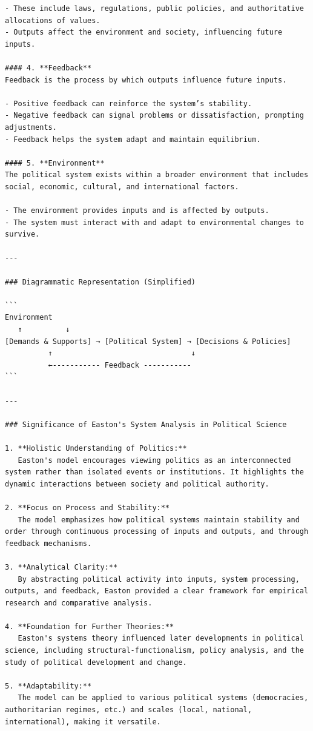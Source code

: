 \begin{instructbox}
\begin{lstlisting}[breakindent=0pt, breaklines=true, breakatwhitespace=true, frame=single, backgroundcolor=\color{green!10}]
- These include laws, regulations, public policies, and authoritative allocations of values.
- Outputs affect the environment and society, influencing future inputs.

#### 4. **Feedback**
Feedback is the process by which outputs influence future inputs.

- Positive feedback can reinforce the system’s stability.
- Negative feedback can signal problems or dissatisfaction, prompting adjustments.
- Feedback helps the system adapt and maintain equilibrium.

#### 5. **Environment**
The political system exists within a broader environment that includes social, economic, cultural, and international factors.

- The environment provides inputs and is affected by outputs.
- The system must interact with and adapt to environmental changes to survive.

---

### Diagrammatic Representation (Simplified)

```
Environment
   ↑          ↓
[Demands & Supports] → [Political System] → [Decisions & Policies]
          ↑                                ↓
          ←----------- Feedback -----------
```

---

### Significance of Easton's System Analysis in Political Science

1. **Holistic Understanding of Politics:**
   Easton's model encourages viewing politics as an interconnected system rather than isolated events or institutions. It highlights the dynamic interactions between society and political authority.

2. **Focus on Process and Stability:**
   The model emphasizes how political systems maintain stability and order through continuous processing of inputs and outputs, and through feedback mechanisms.

3. **Analytical Clarity:**
   By abstracting political activity into inputs, system processing, outputs, and feedback, Easton provided a clear framework for empirical research and comparative analysis.

4. **Foundation for Further Theories:**
   Easton's systems theory influenced later developments in political science, including structural-functionalism, policy analysis, and the study of political development and change.

5. **Adaptability:**
   The model can be applied to various political systems (democracies, authoritarian regimes, etc.) and scales (local, national, international), making it versatile.


\end{lstlisting}
\end{instructbox}
